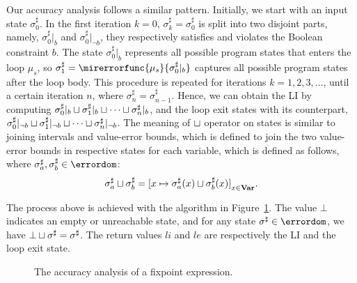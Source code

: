 Our accuracy analysis follows a similar pattern.  Initially, we start
with an input state $\sigma^\sharp_0$.  In the first iteration $k = 0$,
$\sigma^\sharp_k = \sigma^\sharp_0$ is split into two disjoint parts,
namely, $\sigma^\sharp_0|_b$ and $\sigma^\sharp_0|_{\neg b}$, they
respectively satisfies and violates the Boolean constraint $b$.  The state
$\sigma^\sharp_0|_b$ represents all possible program states that enters the
loop $\mu_s$, so $\sigma^\sharp_1 = \mirerrorfunc{\mu_s}{\sigma^\sharp_0|_b}$
captures all possible program states after the loop body.  This procedure
is repeated for iterations $k = 1, 2, 3, \ldots$, until a certain iteration
$n$, where $\sigma^\sharp_n = \sigma^\sharp_{n-1}$.  Hence, we can obtain the
LI by computing $\sigma^\sharp_0|_b \sqcup \sigma^\sharp_1|_b \sqcup \cdots
\sqcup \sigma^\sharp_n|_b$, and the loop exit states with its counterpart,
\ie~$\sigma^\sharp_0|_{\neg b} \sqcup \sigma^\sharp_1|_{\neg b} \sqcup \cdots
\sqcup \sigma^\sharp_n|_{\neg b}$.  The meaning of $\sqcup$ operator on states
is similar to joining intervals and value-error bounds, which is defined
to join the two value-error bounds in respective states for each variable, which is defined as follows, where $\sigma^\sharp_a, \sigma^\sharp_b \in \errordom$:
\begin{equation}
    \sigma^\sharp_a \join \sigma^\sharp_b =
        {%
            [ x \mapsto \sigma^\sharp_a(x) \join \sigma^\sharp_b(x) ]
        }_{x \in \varset}.
\end{equation}

The process above is achieved with the algorithm in Figure~\ref{alg:fix}.
The value $\bot$ indicates an empty or unreachable state, and for any
state $\sigma^\sharp \in \errordom$, we have $\bot \sqcup \sigma^\sharp =
\sigma^\sharp$.  The return values $li$ and $le$ are respectively the LI and
the loop exit state.
\newcommand{\statett}{\ensuremath\sigma^\sharp_{\mathrm{tt}}}
\newcommand{\stateff}{\ensuremath\sigma^\sharp_{\mathrm{ff}}}

\begin{figure}[ht]
    \centering
    \begin{algorithmic}
            \Loop%
                \State{$\statett \gets \sigma^\sharp_k|_b$;}
                \State{$\stateff \gets \sigma^\sharp_k|_{\neg b}$}
                \State{$li \gets li \join \statett$;}
                \State{$le \gets le \join \stateff$}
                \EndIf%
            \EndLoop%
        \EndFunction%
    \end{algorithmic}
    \caption{%
        The accuracy analysis of a fixpoint expression.}\label{alg:fix}
\end{figure}
